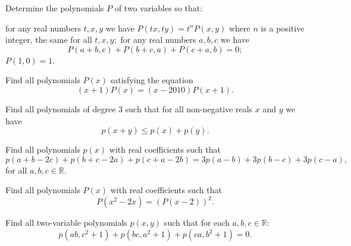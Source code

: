 \documentclass[12pt,a4paper]{memoir}
\theoremstyle{definition}
\begin{document}
	
	


\begin{question}
	Determine the polynomials $P$ of two variables so that:
	\begin{tasks}
		\task for any real numbers $t,x,y$ we have $P(tx,ty) = t^n P(x,y)$ where $n$ is a positive integer, the same for all $t,x,y;$
		\task for any real numbers $a,b,c$ we have \[P(a + b,c) + P(b + c,a) + P(c + a,b) = 0;\]
		\task $P(1,0) =1.$
	\end{tasks}
\end{question}



\begin{question}
	Find all polynomials $ P(x)$ satisfying the equation
	\[(x+1)P(x)=(x-2010)P(x+1).\]
\end{question}




\begin{question}
	Find all polynomials of degree $3$ such that for all non-negative reals $x$ and $y$ we have
	\[p(x+y) \leq p(x)+p(y).\]
\end{question}



\begin{question}
	Find all polynomials $p(x)$ with real coefficients such that
	\[p(a + b - 2c) + p(b + c - 2a) + p(c + a - 2b) = 3p(a - b) + 3p(b - c) + 3p(c - a),\]
	for all $a, b, c\in\mathbb{R}$.
\end{question}



\begin{question}
	Find all  polynomials $P(x)$ with real coefficients such that
	\[P(x^2-2x)=\left(P(x-2)\right)^2.\]
\end{question}



\begin{question}
	Find all two-variable polynomials $p(x,y)$ such that for each $a,b,c\in\mathbb R$:
	\[p(ab,c^2+1)+p(bc,a^2+1)+p(ca,b^2+1)=0.\]
\end{question}
\end{document}
